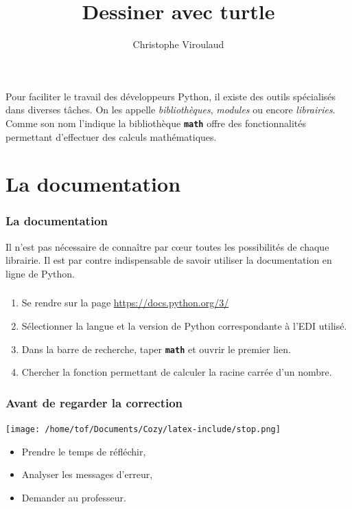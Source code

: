 \documentclass[svgnames,11pt]{beamer}
\author[]{Christophe Viroulaud}
\title{Dessiner avec turtle}
\date{}
\institute{Première - NSI}
\begin{document}
\begin{frame}
\titlepage
\end{frame}
\begin{frame}
    \frametitle{}

    Pour faciliter le travail des développeurs Python, il existe des outils spécialisés dans diverses tâches. On les appelle \emph{bibliothèques}, \emph{modules} ou encore \emph{librairies}. Comme son nom l'indique la bibliothèque \textbf{\texttt{math}} offre des fonctionnalités permettant d'effectuer des calculs mathématiques.
\begin{center}
\end{center}
\end{frame}
\section{La documentation}
\begin{frame}
    \frametitle{La documentation}

    Il n'est pas nécessaire de connaître par cœur toutes les possibilités de chaque librairie. Il est par contre indispensable de savoir utiliser la documentation en ligne de Python.

\end{frame}
\begin{frame}
    \frametitle{}

    \begin{activite}
        \begin{enumerate}
            \item Se rendre sur la page \url{https://docs.python.org/3/}
            \item Sélectionner la langue et la version de Python correspondante à l'EDI utilisé.
            \item Dans la barre de recherche, taper \textbf{\texttt{math}} et ouvrir le premier lien.
            \item Chercher la fonction permettant de calculer la racine carrée d'un nombre.
            \end{enumerate}
    \end{activite}

\end{frame}
\begin{frame}
    \frametitle{Avant de regarder la correction}
\begin{center}
    \centering
    \texttt{[image: /home/tof/Documents/Cozy/latex-include/stop.png]}
    \end{center}
{\Large
    \begin{itemize}
        \item Prendre le temps de réfléchir,
        \item Analyser les messages d'erreur,
        \item Demander au professeur.
    \end{itemize}
}
\end{frame}
\end{document}

